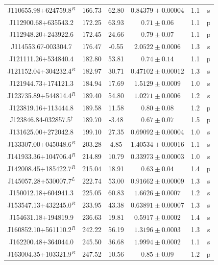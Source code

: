 \begin{table}
\begin{footnotesize}
\begin{tabular}{c|ccccc}
    J110655.98+624759.8${}^R$ & 166.73 & 62.80 & $0.84379 \pm 0.00004$ & 1.1 & s\\ %
    J112900.68+635543.2 & 172.25 & 63.93 & $0.71 \pm 0.06$ & 1.1 & p\\ %
    J112948.20+243922.6 & 172.45 & 24.66 & $0.79 \pm 0.07$ & 1.1 & p\\ %
    J114553.67-003304.7 & 176.47 & -0.55 & $2.0522 \pm 0.0006$ & 1.3 & s\\ %
    J121111.26+534840.4 & 182.80 & 53.81 & $0.74 \pm 0.14$ & 1.1 & p\\ %
    J121152.04+304232.4${}^R$ & 182.97 & 30.71 & $0.47102 \pm 0.00012$ & 1.3 & s\\ %
    J121944.73+174121.3 & 184.94 & 17.69 & $1.5129 \pm 0.0009$ & 1.0 & s\\ %
    J123735.89+544814.4${}^R$ & 189.40 & 54.80 & $1.0271 \pm 0.0006$ & 1.2 & s\\ %
    J123819.16+113444.8 & 189.58 & 11.58 & $0.80 \pm 0.08$ & 1.2 & p\\ %
    J123846.84-032857.5${}^\dagger$ & 189.70 & -3.48 & $0.67 \pm 0.07$ & 1.5 & p\\ %
    J131625.00+272042.8 & 199.10 & 27.35 & $0.69092 \pm 0.00004$ & 1.0 & s\\ %
    J133307.00+045048.6${}^R$ & 203.28 & 4.85 & $1.40534 \pm 0.00016$ & 1.1 & s\\ %
    J141933.36+104706.4${}^R$ & 214.89 & 10.79 & $0.33973 \pm 0.00003$ & 1.0 & s\\ %
    J142008.45+185422.7${}^R$ & 215.04 & 18.91 & $0.63 \pm 0.04$ & 1.4 & p\\ %
    J145057.28+530007.7${}^L$ & 222.74 & 53.00 & $0.91662 \pm 0.00009$ & 1.3 & s\\ %
    J150012.18+604941.3 & 225.05 & 60.83 & $1.6626 \pm 0.0007$ & 1.2 & s\\ %
    J153547.13+432245.0${}^R$ & 233.95 & 43.38 & $0.63891 \pm 0.00007$ & 1.3 & s\\ %
    J154631.18+194819.9 & 236.63 & 19.81 & $0.5917 \pm 0.0002$ & 1.4 & s\\ %
    J160852.10+561110.2${}^R$ & 242.22 & 56.19 & $1.3196 \pm 0.0003$ & 1.3 & s\\ %
    J162200.48+364044.0 & 245.50 & 36.68 & $1.9994 \pm 0.0002$ & 1.1 & s\\ %
    J163004.35+103321.9${}^R$ & 247.52 & 10.56 & $0.85 \pm 0.09$ & 1.2 & p\\ %

\end{tabular}
\end{footnotesize}
\end{table}
